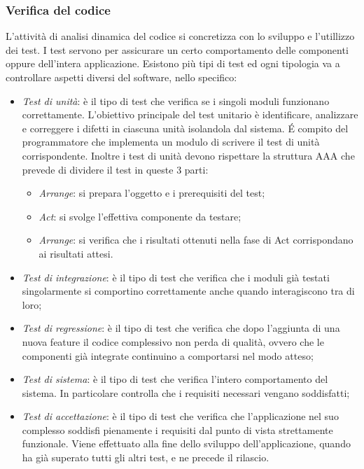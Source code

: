 \subsubsection{Verifica del codice}
L'attività di analisi dinamica del codice si concretizza con lo sviluppo e l'utillizzo dei test. I test servono per assicurare un certo comportamento delle componenti oppure dell'intera applicazione. Esistono più tipi di test ed ogni tipologia va a controllare aspetti diversi del software, nello specifico:
\begin{itemize}
    \item \textit{Test di unità}:  è il tipo di test che verifica se i singoli moduli funzionano correttamente. L'obiettivo principale del test unitario è identificare, analizzare e correggere i difetti in ciascuna unità isolandola dal sistema. É compito del programmatore che implementa un modulo di scrivere il test di unità corrispondente. Inoltre i test di unità devono rispettare la struttura AAA che prevede di dividere il test in queste 3 parti:
	\begin{itemize}
		\item \textit{Arrange}: si prepara l'oggetto e i prerequisiti del test;
		\item \textit{Act}: si svolge l'effettiva componente da testare;
		\item \textit{Arrange}: si verifica che i risultati ottenuti nella fase di Act corrispondano ai risultati attesi.
	\end{itemize}
    \item \textit{Test di integrazione}: è il tipo di test che verifica che i moduli già testati singolarmente si comportino correttamente anche quando interagiscono tra di loro;
    \item \textit{Test di regressione}: è il tipo di test che verifica che dopo l'aggiunta di una nuova feature il codice complessivo non perda di qualità, ovvero che le componenti già integrate continuino a comportarsi nel modo atteso;
    \item \textit{Test di sistema}:  è il tipo di test che verifica l'intero comportamento del sistema. In particolare controlla che i requisiti necessari vengano soddisfatti;
    \item \textit{Test di accettazione}:  è il tipo di test che verifica che l'applicazione nel suo complesso soddisfi pienamente i requisiti dal punto di vista strettamente funzionale. Viene effettuato alla fine dello sviluppo dell'applicazione, quando ha già superato tutti gli altri test, e ne precede il rilascio.
\end{itemize}
